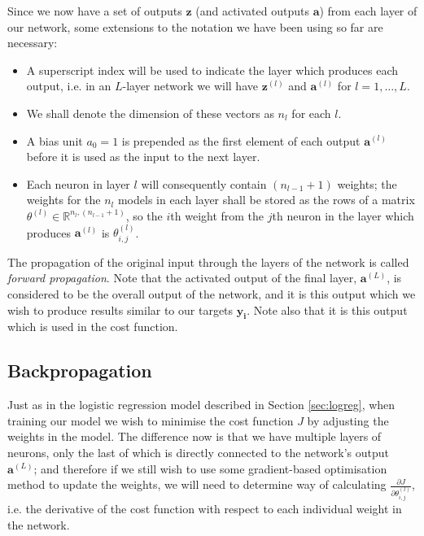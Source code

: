 \documentclass{article}[11pt]
\begin{document}
        Since we now have a set of outputs $\mathbf{z}$ (and activated outputs $\mathbf{a}$) from each layer of our network, some extensions to the notation we have been using so far are necessary:
        
        \begin{itemize}
            
            \item A superscript index will be used to indicate the layer which produces each output, i.e. in an $L$-layer network we will have $\mathbf{z}^{(l)}$ and $\mathbf{a}^{(l)}$ for $l = 1, \ldots, L$.
            
            \item We shall denote the dimension of these vectors as $n_l$ for each $l$.
            
            \item A bias unit $a_0 = 1$ is prepended as the first element of each output $\mathbf{a}^{(l)}$ before it is used as the input to the next layer.
            
            \item Each neuron in layer $l$ will consequently contain $(n_{l-1} + 1)$ weights; the weights for the $n_l$ models in each layer shall be stored as the rows of a matrix $\theta^{(l)} \in \mathbb{R}^{n_l, (n_{l-1}+1)}$, so the $i$th weight from the $j$th neuron in the layer which produces $\mathbf{a}^{(l)}$ is $\theta^{(l)}_{i,j}$.
        
        \end{itemize}
        
        The propagation of the original input through the layers of the network is called \textit{forward propagation}. Note that the activated output of the final layer, $\mathbf{a}^{(L)}$, is considered to be the overall output of the network, and it is this output which we wish to produce results similar to our targets $\mathbf{y_i}$. Note also that it is this output which is used in the cost function.
        
        
        

    \subsection{Backpropagation}
        
        Just as in the logistic regression model described in Section \ref{sec:logreg}, when training our model we wish to minimise the cost function $J$ by adjusting the weights in the model. The difference now is that we have multiple layers of neurons, only the last of which is directly connected to the network's output $\mathbf{a}^{(L)}$; and therefore if we still wish to use some gradient-based optimisation method to update the weights, we will need to determine way of calculating $\frac{\partial J}{\partial \theta^{(l)}_{i,j}}$, i.e. the derivative of the cost function with respect to each individual weight in the network.
        
\end{document}
